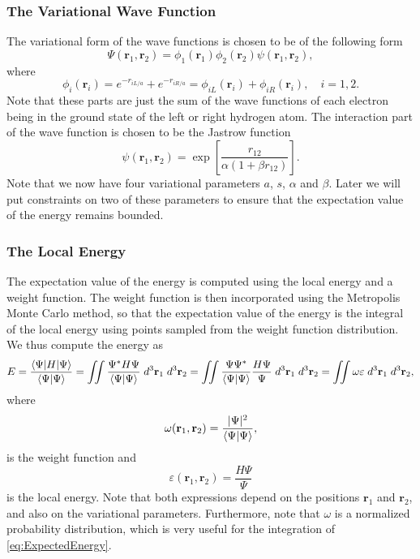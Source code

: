 \documentclass[twoside]{article}
\newcommand{\bfr}{\ensuremath{\mathbf{r}}}
\begin{document}
\subsubsection*{The Variational Wave Function}
The variational form of the wave functions is chosen to be of the following form
\begin{equation}
\Psi(\bfr_1,\bfr_2) = \phi_1(\bfr_1)\phi_2(\bfr_2)\psi(\bfr_1,\bfr_2),
\end{equation}
where 
\begin{equation}
\phi_i(\bfr_i) = e^{-r_{iL/a}} + e^{-r_{iR/a}} = \phi_{iL}(\bfr_i) + \phi_{iR}(\bfr_i), \quad i=1,2.
\end{equation}
Note that these parts are just the sum of the wave functions of each electron being in the ground state of the left or right hydrogen atom. The interaction part of the wave function is chosen to be the Jastrow function
\begin{equation}
\psi(\bfr_1,\bfr_2) = \exp\left[ \frac{r_{12}}{\alpha(1+\beta r_{12})} \right].
\end{equation}
Note that we now have four variational parameters $a$, $s$, $\alpha$ and $\beta$. Later we will put constraints on two of these parameters to ensure that the expectation value of the energy remains bounded.

\subsubsection*{The Local Energy}
The expectation value of the energy is computed using the local energy and a weight function. The weight function is then incorporated using the Metropolis Monte Carlo method, so that the expectation value of the energy is the integral of the local energy using points sampled from the weight function distribution. We thus compute the energy as
\begin{equation}
E = \frac{\braket{\Psi|H|\Psi}}{\braket{\Psi|\Psi}} = 
\iint \frac{\Psi^* H \Psi}{\braket{\Psi|\Psi}}  \; d^3\bfr_1 \; d^3\bfr_2 = 
\iint \frac{\Psi\Psi^*}{\braket{\Psi|\Psi}} \frac{H \Psi}{\Psi} \; d^3\bfr_1 \; d^3\bfr_2 = \iint \omega \varepsilon \; d^3\bfr_1 \; d^3\bfr_2,
\label{eq:ExpectedEnergy}
\end{equation} 
where
\begin{equation}
\omega(\bfr_1,\bfr_2) = \frac{|\Psi|^2}{\braket{\Psi|\Psi}},
\end{equation}
is the weight function and
\begin{equation}
\varepsilon(\bfr_1,\bfr_2) = \frac{H \Psi}{\Psi}
\label{eq:LocalEnergy}
\end{equation}
is the local energy. Note that both expressions depend on the positions $\bfr_1$ and $\bfr_2$, and also on the variational parameters. Furthermore, note that $\omega$ is a normalized probability distribution, which is very useful for the integration of \eqref{eq:ExpectedEnergy}.
\end{document}
